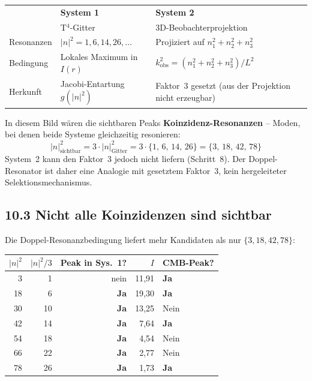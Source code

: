 \begin{center}
\begin{tabular}{p{3cm}p{5cm}p{5cm}}
\toprule
 & \textbf{System 1} & \textbf{System 2} \\
 & T$^4$-Gitter & 3D-Beobachterprojektion \\
\midrule
Resonanzen & $|n|^2 = 1, 6, 14, 26, \ldots$ &
  Projiziert auf $n_1^2+n_2^2+n_3^2$ \\
Bedingung & Lokales Maximum in $I(r)$ &
  $k_\mathrm{obs}^2 = (n_1^2+n_2^2+n_3^2)/L^2$ \\
Herkunft & Jacobi-Entartung $g(|n|^2)$ &
  Faktor~3 gesetzt (aus der Projektion nicht erzeugbar) \\
\bottomrule
\end{tabular}
\end{center}

In diesem Bild wären die sichtbaren Peaks \textbf{Koinzidenz-Resonanzen}
-- Moden, bei denen beide Systeme gleichzeitig resonieren:
\[
  |n|^2_\mathrm{sichtbar}
  = 3 \cdot |n|^2_\mathrm{Gitter}
  = 3 \cdot \{1,\,6,\,14,\,26\}
  = \{3,\,18,\,42,\,78\}
\]
System~2 kann den Faktor~3 jedoch nicht liefern (Schritt~8). Der
Doppel-Resonator ist daher eine Analogie mit gesetztem Faktor~3, kein
hergeleiteter Selektionsmechanismus.

\subsection*{10.3 Nicht alle Koinzidenzen sind sichtbar}

Die Doppel-Resonanzbedingung liefert mehr Kandidaten als nur
$\{3, 18, 42, 78\}$:

\begin{center}
\begin{tabular}{rrrrl}
\toprule
$|n|^2$ & $|n|^2/3$ & Peak in Sys.~1? & $I$ & CMB-Peak? \\
\midrule
3  & 1  & nein & 11{,}91 & \textbf{Ja} \\
18 & 6  & \textbf{Ja} & 19{,}30 & \textbf{Ja} \\
30 & 10 & \textbf{Ja} & 13{,}25 & Nein \\
42 & 14 & \textbf{Ja} & 7{,}64  & \textbf{Ja} \\
54 & 18 & \textbf{Ja} & 4{,}54  & Nein \\
66 & 22 & \textbf{Ja} & 2{,}77  & Nein \\
78 & 26 & \textbf{Ja} & 1{,}73  & \textbf{Ja} \\
\bottomrule
\end{tabular}
\end{center}

